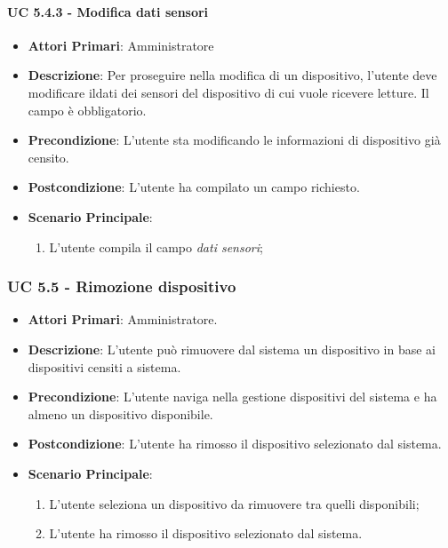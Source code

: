 				\paragraph{UC 5.4.3 - Modifica dati sensori}
				\begin{itemize}
					\item \textbf{Attori Primari}: Amministratore
					\item \textbf{Descrizione}: Per proseguire nella modifica di un dispositivo, l'utente deve modificare ildati dei sensori del dispositivo di cui vuole ricevere letture. Il campo è obbligatorio.
					\item \textbf{Precondizione}: L'utente sta modificando le informazioni di dispositivo già censito.
					\item \textbf{Postcondizione}: L'utente ha compilato un campo richiesto.
					\item \textbf{Scenario Principale}:
					\begin{enumerate}
						\item{L'utente compila il campo \textit{dati sensori};}
					\end{enumerate}
				\end{itemize}
			
			\subsubsection{UC 5.5 - Rimozione dispositivo}
			\begin{itemize}
				\item \textbf{Attori Primari}: Amministratore.
				\item \textbf{Descrizione}: L'utente può rimuovere dal sistema un dispositivo in base ai dispositivi censiti a sistema.
				\item \textbf{Precondizione}: L'utente naviga nella gestione dispositivi del sistema e ha almeno un dispositivo disponibile.
				\item \textbf{Postcondizione}: L'utente ha rimosso il dispositivo selezionato dal sistema.
				\item \textbf{Scenario Principale}:
				\begin{enumerate}
					\item{L'utente seleziona un dispositivo da rimuovere tra quelli disponibili;}
					\item{L'utente ha rimosso il dispositivo selezionato dal sistema.}
				\end{enumerate}
			\end{itemize}
			
